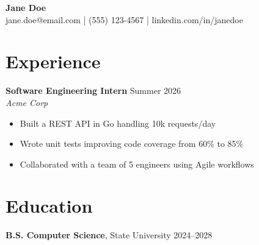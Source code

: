 \documentclass[11pt]{article}
\begin{document}
\begin{center}
{\Large \textbf{Jane Doe}} \\
jane.doe@email.com \quad | \quad (555) 123-4567 \quad | \quad linkedin.com/in/janedoe
\end{center}

\section*{Experience}
\textbf{Software Engineering Intern} \hfill Summer 2026 \\
\textit{Acme Corp}
\begin{itemize}[leftmargin=*, itemsep=2pt]
  \item Built a REST API in Go handling 10k requests/day
  \item Wrote unit tests improving code coverage from 60\% to 85\%
  \item Collaborated with a team of 5 engineers using Agile workflows
\end{itemize}

\section*{Education}
\textbf{B.S. Computer Science}, State University \hfill 2024--2028
\end{document}
